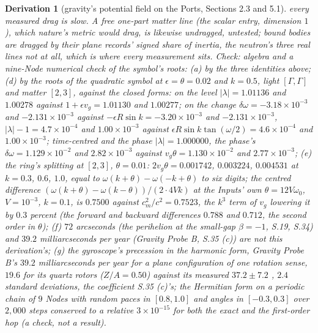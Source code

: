 \documentclass[pdflatex,sn-mathphys-num]{sn-jnl}
\theoremstyle{thmstyleone}
\newtheorem{derivation}{Derivation}
\begin{document}
\begin{derivation}[gravity's potential field on the Ports, Sections 2.3 and 5.1]
every measured drag is slow. A free one-part matter line (the scalar entry, dimension $1$), which nature's metric would drag, is likewise undragged, untested; bound bodies are dragged by their plane records' signed share of inertia, the neutron's three real lines not at all, which is where every measurement sits.
\emph{Check:} algebra and a nine-Node numerical check of the symbol's roots: (a) by the three identities above; (d) by the roots of the quadratic symbol at $\epsilon = \theta = 0.02$ and $k = 0.5$, light $[\Gamma, \Gamma]$ and matter $[2, 3]$, against the closed forms: on the level $|\lambda| = 1.01136$ and $1.00278$ against $1 + \epsilon v_g = 1.01130$ and $1.00277$; on the change $\delta\omega = -3.18 \times 10^{-3}$ and $-2.131 \times 10^{-3}$ against $-\epsilon R\sin k = -3.20 \times 10^{-3}$ and $-2.131 \times 10^{-3}$, $|\lambda| - 1 = 4.7 \times 10^{-4}$ and $1.00 \times 10^{-3}$ against $\epsilon R\sin k\tan(\omega / 2) = 4.6 \times 10^{-4}$ and $1.00 \times 10^{-3}$; time-centred and the phase $|\lambda| = 1.000000$, the phase's $\delta\omega = 1.129 \times 10^{-2}$ and $2.82 \times 10^{-3}$ against $v_g\theta = 1.130 \times 10^{-2}$ and $2.77 \times 10^{-3}$; (e) the ring's splitting at $[2, 3]$, $\theta = 0.01$: $2v_g\theta = 0.001742$, $0.003224$, $0.004531$ at $k = 0.3$, $0.6$, $1.0$, equal to $\omega(k + \theta) - \omega(-k + \theta)$ to six digits; the centred difference $(\omega(k + \theta) - \omega(k - \theta)) / (2 \cdot 4Vk)$ at the Inputs' own $\theta = 12V\omega_0$, $V = 10^{-3}$, $k = 0.1$, is $0.7500$ against $c_m^2 / c^2 = 0.7523$, the $k^3$ term of $v_g$ lowering it by $0.3$ percent (the forward and backward differences $0.788$ and $0.712$, the second order in $\theta$); (f) $72$ arcseconds (the perihelion at the small-gap $\beta = -1$, S.19, S.34) and $39.2$ milliarcseconds per year (Gravity Probe B, S.35 (c)) are not this derivation's; (g) the gyroscope's precession in the harmonic form, Gravity Probe B's $39.2$ milliarcseconds per year for a plane configuration of one rotation sense, $19.6$ for its quartz rotors ($Z/A = 0.50$) against its measured $37.2 \pm 7.2$ \cite{everitt}, $2.4$ standard deviations, the coefficient S.35 (c)'s; the Hermitian form on a periodic chain of $9$ Nodes with random paces in $[0.8, 1.0]$ and angles in $[-0.3, 0.3]$ over $2{,}000$ steps conserved to a relative $3 \times 10^{-15}$ for both the exact and the first-order hop (a check, not a result).

\end{derivation}
\end{document}
